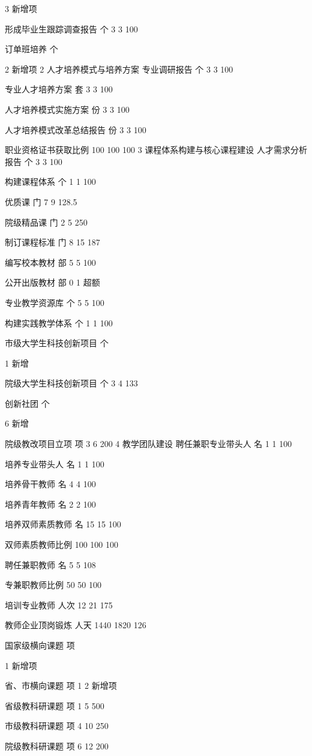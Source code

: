 3
新增项


形成毕业生跟踪调查报告
个
3
3
100%


订单班培养
个

2
新增项
2
人才培养模式与培养方案
专业调研报告
个
3
3
100%


专业人才培养方案
套
3
3
100%


人才培养模式实施方案
份
3
3
100%


人才培养模式改革总结报告
份
3
3
100%


职业资格证书获取比例
%
100%
100%
100%
3
课程体系构建与核心课程建设
人才需求分析报告
个
3
3
100%


构建课程体系
个
1
1
100%


优质课
门
7
9
128.5%


院级精品课
门
2
5
250%


制订课程标准
门
8
15
187%


编写校本教材
部
5
5
100%


公开出版教材
部
0
1
超额


专业教学资源库
个
5
5
100%


构建实践教学体系
个
1
1
100%


市级大学生科技创新项目
个

1
新增


院级大学生科技创新项目
个
3
4
133%


创新社团
个

6
新增


院级教改项目立项
项
3
6
200%
4
教学团队建设
聘任兼职专业带头人
名
1
1
100%


培养专业带头人
名
1
1
100%


培养骨干教师
名
4
4
100%


培养青年教师
名
2
2
100%


培养双师素质教师
名
15
15
100%


双师素质教师比例
%
100
100
100%


聘任兼职教师
名
5
5
108%


专兼职教师比例
%
50
50
100%


培训专业教师
人次
12
21
175%


教师企业顶岗锻炼
人天
1440
1820
126%


国家级横向课题
项

1
新增项


省、市横向课题
项
1
2
新增项


省级教科研课题
项
1
5
500%


市级教科研课题
项
4
10
250%


院级教科研课题
项
6
12
200%


